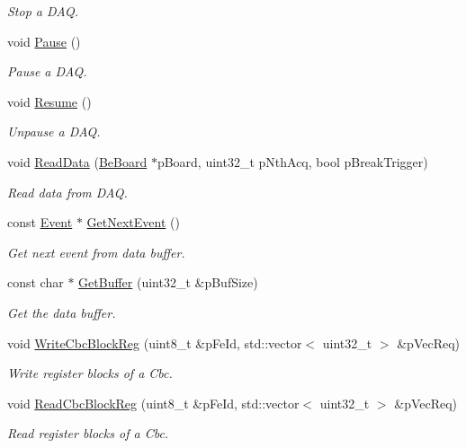 \begin{DoxyCompactItemize}
\begin{DoxyCompactList}\small\item\em Stop a D\-A\-Q. \end{DoxyCompactList}\item 
void \hyperlink{class_ph2___hw_interface_1_1_glib_f_w_interface_a05d7f790e0316b51714293e8089086f3}{Pause} ()
\begin{DoxyCompactList}\small\item\em Pause a D\-A\-Q. \end{DoxyCompactList}\item 
void \hyperlink{class_ph2___hw_interface_1_1_glib_f_w_interface_aedd3abfb576016701da27fabc975ac13}{Resume} ()
\begin{DoxyCompactList}\small\item\em Unpause a D\-A\-Q. \end{DoxyCompactList}\item 
void \hyperlink{class_ph2___hw_interface_1_1_glib_f_w_interface_a26c35fec3518f40d09ebc7f0114be19b}{Read\-Data} (\hyperlink{class_ph2___hw_description_1_1_be_board}{Be\-Board} $\ast$p\-Board, uint32\-\_\-t p\-Nth\-Acq, bool p\-Break\-Trigger)
\begin{DoxyCompactList}\small\item\em Read data from D\-A\-Q. \end{DoxyCompactList}\item 
const \hyperlink{class_ph2___hw_interface_1_1_event}{Event} $\ast$ \hyperlink{class_ph2___hw_interface_1_1_glib_f_w_interface_afebeee20cd186f919189e5f349c6a49f}{Get\-Next\-Event} ()
\begin{DoxyCompactList}\small\item\em Get next event from data buffer. \end{DoxyCompactList}\item 
const char $\ast$ \hyperlink{class_ph2___hw_interface_1_1_glib_f_w_interface_abd15e45762db510cdc41e039dabaab6c}{Get\-Buffer} (uint32\-\_\-t \&p\-Buf\-Size)
\begin{DoxyCompactList}\small\item\em Get the data buffer. \end{DoxyCompactList}\item 
void \hyperlink{class_ph2___hw_interface_1_1_glib_f_w_interface_a1a43546404b9097fafa83302cd326e4c}{Write\-Cbc\-Block\-Reg} (uint8\-\_\-t \&p\-Fe\-Id, std\-::vector$<$ uint32\-\_\-t $>$ \&p\-Vec\-Req)
\begin{DoxyCompactList}\small\item\em Write register blocks of a Cbc. \end{DoxyCompactList}\item 
void \hyperlink{class_ph2___hw_interface_1_1_glib_f_w_interface_af1fc5669e98ae17f235c47f08ac256c0}{Read\-Cbc\-Block\-Reg} (uint8\-\_\-t \&p\-Fe\-Id, std\-::vector$<$ uint32\-\_\-t $>$ \&p\-Vec\-Req)
\begin{DoxyCompactList}\small\item\em Read register blocks of a Cbc. \end{DoxyCompactList}\end{DoxyCompactItemize}
